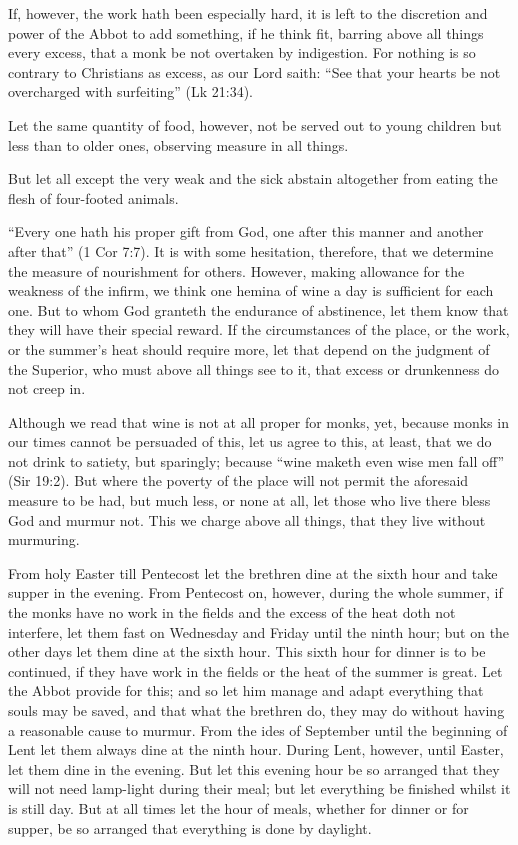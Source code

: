 If, however, the work hath been especially hard, it is left to the discretion and power of the Abbot to add something, if he think fit, barring above all things every excess, that a monk be not overtaken by indigestion. For nothing is so contrary to Christians as excess, as our Lord saith: ``See that your hearts be not overcharged with surfeiting'' (Lk 21:34).

Let the same quantity of food, however, not be served out to young children but less than to older ones, observing measure in all things.

But let all except the very weak and the sick abstain altogether from eating the flesh of four-footed animals.


``Every one hath his proper gift from God, one after this manner and another after that'' (1 Cor 7:7). It is with some hesitation, therefore, that we determine the measure of nourishment for others. However, making allowance for the weakness of the infirm, we think one hemina of wine a day is sufficient for each one. But to whom God granteth the endurance of abstinence, let them know that they will have their special reward. If the circumstances of the place, or the work, or the summer's heat should require more, let that depend on the judgment of the Superior, who must above all things see to it, that excess or drunkenness do not creep in.

Although we read that wine is not at all proper for monks, yet, because monks in our times cannot be persuaded of this, let us agree to this, at least, that we do not drink to satiety, but sparingly; because ``wine maketh even wise men fall off'' (Sir 19:2). But where the poverty of the place will not permit the aforesaid measure to be had, but much less, or none at all, let those who live there bless God and murmur not. This we charge above all things, that they live without murmuring.


From holy Easter till Pentecost let the brethren dine at the sixth hour and take supper in the evening. From Pentecost on, however, during the whole summer, if the monks have no work in the fields and the excess of the heat doth not interfere, let them fast on Wednesday and Friday until the ninth hour; but on the other days let them dine at the sixth hour. This sixth hour for dinner is to be continued, if they have work in the fields or the heat of the summer is great. Let the Abbot provide for this; and so let him manage and adapt everything that souls may be saved, and that what the brethren do, they may do without having a reasonable cause to murmur. From the ides of September until the beginning of Lent let them always dine at the ninth hour. During Lent, however, until Easter, let them dine in the evening. But let this evening hour be so arranged that they will not need lamp-light during their meal; but let everything be finished whilst it is still day. But at all times let the hour of meals, whether for dinner or for supper, be so arranged that everything is done by daylight.

